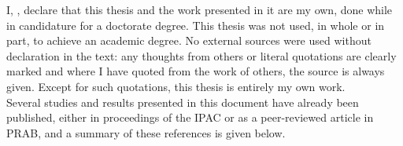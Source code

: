 \begin{declaration}

\vspace{1cm}

I, \authorname, declare that this thesis and the work presented in it are my own, done while in candidature for a doctorate degree.
This thesis was not used, in whole or in part, to achieve an academic degree.
No external sources were used without declaration in the text: any thoughts from others or literal quotations are clearly marked and where I have quoted from the work of others, the source is always given.
Except for such quotations, this thesis is entirely my own work.\\

Several studies and results presented in this document have already been published, either in proceedings of the \acrfull{IPAC} or as a peer-reviewed article in \acrfull{PRAB}, and a summary of these references is given below.\\


\end{declaration}
